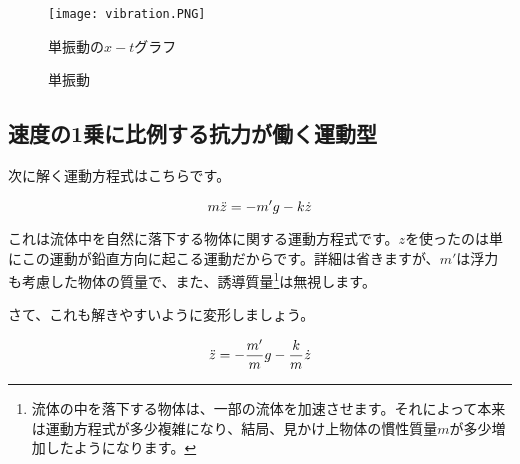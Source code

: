 \begin{figure}[!ht]
  \centering
  \texttt{[image: vibration.PNG]}
  \caption{単振動の$x-t$グラフ}
  \label{fig:vibration}
\end{figure}
\fi

\begin{figure}[htbp]
\begin{center}
\caption{単振動}
\end{center}
\end{figure}





\subsection{速度の1乗に比例する抗力が働く運動型}
\label{vel_1}
次に解く運動方程式はこちらです。

\begin{equation}
    m\ddot{z} = -m'g - k\dot{z} \notag
\end{equation}

これは流体中を自然に落下する物体に関する運動方程式です。$z$を使ったのは単にこの運動が鉛直方向に起こる運動だからです。詳細は省きますが、$m'$は浮力も考慮した物体の質量で、また、誘導質量\footnote{流体の中を落下する物体は、一部の流体を加速させます。それによって本来は運動方程式が多少複雑になり、結局、見かけ上物体の慣性質量$m$が多少増加したようになります。}は無視します。

さて、これも解きやすいように変形しましょう。

\begin{equation}
    \ddot{z} = -\frac{m'}{m}g - \frac{k}{m}\dot{z} \notag
\end{equation}


